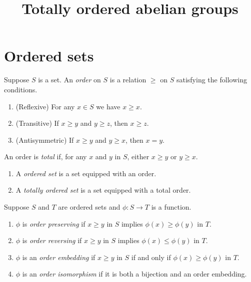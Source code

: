 

\title{Totally ordered abelian groups}


\maketitle

\label{section-phantom}
\tableofcontents

\section{Ordered sets}

\begin{definition}
Suppose $S$ is a set. An \emph{order} on $S$ is a relation $\geq$ on $S$ satisfying the following conditions.  
\begin{enumerate}[label=(\arabic{*})]
	\item (Reflexive) For any $x \in S$ we have $x \geq x$. 
	\item (Transitive) If $x \geq y$ and $y \geq z$, then $x \geq z$.
	\item (Antisymmetric) If $x \geq y$ and $y \geq x$, then $x = y$.  
\end{enumerate}
An order is \emph{total} if, for any $x$ and $y$ in $S$, either $x \geq y$ or $y \geq x$. 
\end{definition}

\begin{definition}
\begin{enumerate}[label=(\alph{*})]
	\item A \emph{ordered set} is a set equipped with an order. 
	\item A \emph{totally ordered set} is a set equipped with a total order. 
\end{enumerate}
\end{definition}

\begin{definition}
Suppose $S$ and $T$ are ordered sets and $\phi : S \to T$ is a function.
\begin{enumerate}[label=(\alph{*})]
\item $\phi$ is \emph{order preserving} if $x \geq y$ in $S$ implies $\phi(x) \geq \phi(y)$ in $T$. 
\item $\phi$ is \emph{order reversing} if $x \geq y$ in $S$ implies $\phi(x) \leq \phi(y)$ in $T$. 
\item $\phi$ is an \emph{order embedding} if $x \geq y$ in $S$ if and only if $\phi(x) \geq \phi(y)$ in $T$.
\item $\phi$ is an \emph{order isomorphism} if it is both a bijection and an order embedding. 
\end{enumerate}
\end{definition}

